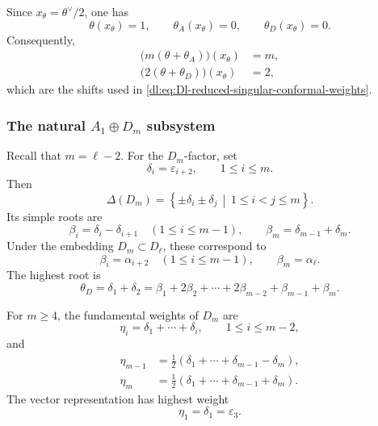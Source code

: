 \documentclass[11pt,reqno]{amsart}
\theoremstyle{definition}
\theoremstyle{remark}
\begin{document}
Since
\(x_\theta=\theta^\vee/2\), one has
\begin{equation*}
  \theta(x_\theta)=1,
  \qquad
  \theta_A(x_\theta)=0,
  \qquad
  \theta_D(x_\theta)=0.
\end{equation*}
Consequently,
\begin{equation*}
\begin{aligned}
  \bigl(m(\theta+\theta_A)\bigr)(x_\theta)&=m,\\
  \bigl(2(\theta+\theta_D)\bigr)(x_\theta)&=2,
\end{aligned}
\end{equation*}
which are the shifts used in
\eqref{dl:eq:Dl-reduced-singular-conformal-weights}.

\subsubsection{The natural \(A_1\oplus D_m\) subsystem}


Recall that \(m=\ell-2\).  For the \(D_m\)-factor, set
\begin{equation*}
  \delta_i=\varepsilon_{i+2},
  \qquad
  1\le i\le m.
\end{equation*}
Then
\begin{equation*}
  \Delta(D_m)
  =
  \left\{
    \pm\delta_i\pm\delta_j
    \,\middle|\,
    1\le i<j\le m
  \right\}.
\end{equation*}
Its simple roots are
\begin{equation*}
  \beta_i=\delta_i-\delta_{i+1}
  \quad(1\le i\le m-1),
  \qquad
  \beta_m=\delta_{m-1}+\delta_m.
\end{equation*}
Under the embedding
\(D_m\subset D_\ell\), these correspond to
\[
  \beta_i=\alpha_{i+2}
  \quad(1\le i\le m-1),
  \qquad
  \beta_m=\alpha_\ell.
\]
The highest root is
\begin{equation}
  \theta_D
  =
  \delta_1+\delta_2
  =
  \beta_1+2\beta_2+\cdots+
  2\beta_{m-2}+\beta_{m-1}+\beta_m.
  \label{dl:eq:Dl-appendix-Dm-highest-root}
\end{equation}

For \(m\ge4\), the fundamental weights of \(D_m\) are
\begin{equation*}
  \eta_i
  =
  \delta_1+\cdots+\delta_i,
  \qquad
  1\le i\le m-2,
\end{equation*}
and
\begin{equation*}
\begin{aligned}
  \eta_{m-1}
  &=
  \frac12
  \left(
    \delta_1+\cdots+\delta_{m-1}-\delta_m
  \right),\\
  \eta_m
  &=
  \frac12
  \left(
    \delta_1+\cdots+\delta_{m-1}+\delta_m
  \right).
\end{aligned}
\end{equation*}
The vector representation has highest weight
\begin{equation*}
  \eta_1=\delta_1=\varepsilon_3.
\end{equation*}
\end{document}
